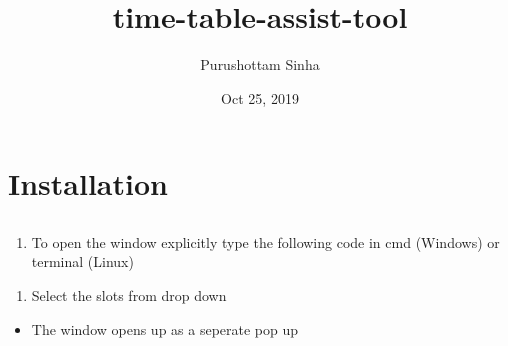 \documentclass[letterpaper,10pt,english]{sphinxmanual}
\title{time-table-assist-tool}
\date{Oct 25, 2019}
\author{Purushottam Sinha}
\begin{document}
\pagestyle{empty}
\sphinxmaketitle
\pagestyle{plain}
\sphinxtableofcontents
\pagestyle{normal}
\label{\detokenize{index::doc}}



\chapter{Installation}
\label{\detokenize{index:installation}}
\begin{sphinxVerbatim}[commandchars=\\\{\}]
   
 
\end{sphinxVerbatim}


\section{}
\label{\detokenize{user_manual:user-manual}}\label{\detokenize{user_manual::doc}}

\subsection{}
\label{\detokenize{user_manual:working-in-gui-1}}

\subsubsection{}
\label{\detokenize{user_manual:steps}}
\begin{enumerate}
%
\item {} 
To open the window explicitly type the following code in cmd (Windows) or terminal (Linux)

\end{enumerate}

\begin{sphinxVerbatim}[commandchars=\\\{\}]
 
\end{sphinxVerbatim}
\begin{enumerate}
%
\setcounter{enumi}{1}
\item {} 
Select the slots from drop down

\end{enumerate}
\begin{itemize}
\item {} 
The window opens up as a seperate pop up

\end{itemize}
\end{document}
